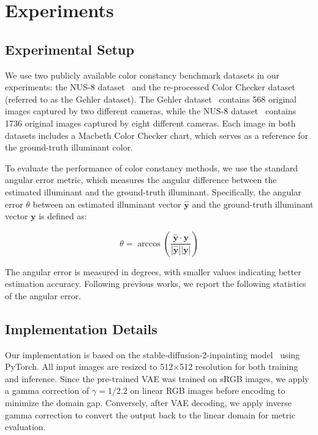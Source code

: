 \section{Experiments}
\label{sec:exp}
\subsection{Experimental Setup}

We use two publicly available color constancy benchmark datasets in our experiments: the NUS-8 dataset~\cite{cheng2014illuminant} and the re-processed Color Checker dataset~\cite{4587765} (referred to as the Gehler dataset). The Gehler dataset~\cite{4587765} contains 568 original images captured by two different cameras, while the NUS-8 dataset~\cite{cheng2014illuminant} contains 1736 original images captured by eight different cameras. Each image in both datasets includes a Macbeth Color Checker chart, which serves as a reference for the ground-truth illuminant color.

\vspace{3pt}  
To evaluate the performance of color constancy methods, we use the standard angular error metric, which measures the angular difference between the estimated illuminant and the ground-truth illuminant. Specifically, the angular error $\theta$ between an estimated illuminant vector $\hat{\mathbf{y}}$ and the ground-truth illuminant vector $\mathbf{y}$ is defined as:
\begin{small}
\begin{equation}
\theta = \arccos\left(\frac{\hat{\mathbf{y}} \cdot \mathbf{y}}{|\hat{\mathbf{y}}| |\mathbf{y}|}\right)
\end{equation}
\end{small}
The angular error is measured in degrees, with smaller values indicating better estimation accuracy. Following previous works, we report the following statistics of the angular error.

\subsection{Implementation Details}
Our implementation is based on the stable-diffusion-2-inpainting model~\cite{rombach2021highresolution} using PyTorch. All input images are resized to 512$\times$512 resolution for both training and inference. Since the pre-trained VAE was trained on sRGB images, we apply a gamma correction of $\gamma = 1/2.2$ on linear RGB images before encoding to minimize the domain gap. Conversely, after VAE decoding, we apply inverse gamma correction to convert the output back to the linear domain for metric evaluation.

